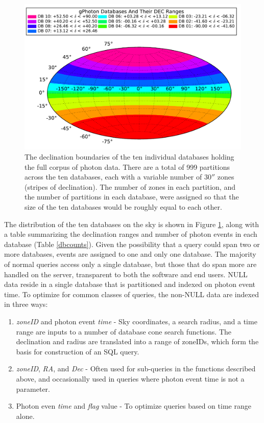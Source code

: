 \documentclass[iop]{emulateapj}
\begin{document}
\begin{figure}[h]
\includegraphics[scale=0.45]{Fig01.pdf}
\caption{The declination boundaries of the ten individual databases holding the full corpus of photon data. There are a total of 999 partitions across the ten databases, each with a variable number of $30''$ zones (stripes of declination).  The number of zones in each partition, and the number of partitions in each database, were assigned so that the size of the ten databases would be roughly equal to each other. \label{dbdist}}
\end{figure}

The distribution of the ten databases on the sky is shown in Figure \ref{dbdist}, along with a table summarizing the declination ranges and number of photon events in each database (Table \ref{dbcounts}). Given the possibility that a query could span two or more databases, events are assigned to one and only one database. The majority of normal queries access only a single database, but those that do span more are handled on the server, transparent to both the software and end users.
	NULL data reside in a single database that is partitioned and indexed on photon event time. To optimize for common classes of queries, the non-NULL data are indexed in three ways:
\begin{enumerate}
	\item{\emph{zoneID} and photon event \emph{time} - Sky coordinates, a search radius, and a time range are inputs to a number of database cone search functions. The declination and radius are translated into a range of zoneIDs, which form the basis for construction of an SQL query.}
	\item{\emph{zoneID}, \emph{RA}, and \emph{Dec} - Often used for sub-queries in the functions described above, and occasionally used in queries where photon event time is not a parameter.}
	\item{Photon even \emph{time} and \emph{flag} value - To optimize queries based on time range alone.}
\end{enumerate}
\end{document}
